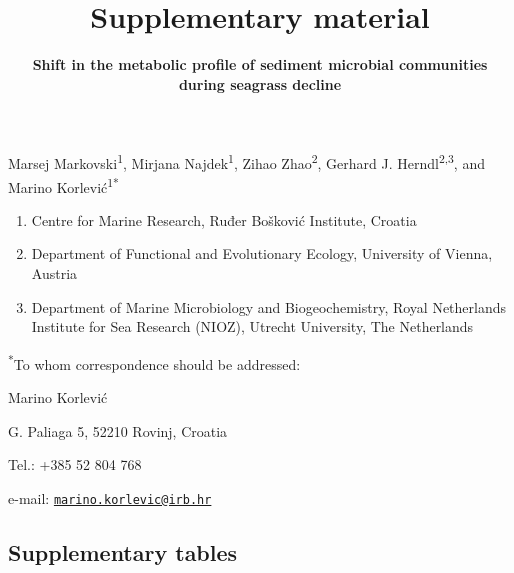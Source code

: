 \documentclass[
  12 pt,
]{article}
\title{\textbf{Supplementary material}}
\subtitle{\textbf{Shift in the metabolic profile of sediment microbial communities during seagrass decline}}
\author{}
\date{\vspace{-2.5em}}
\begin{document}
\maketitle


\renewcommand{\figurename}{Supplementary Figure}
\renewcommand{\tablename}{Supplementary Table}
\renewcommand{\thefigure}{S\arabic{figure}}
\renewcommand{\thetable}{S\arabic{table}}

\vspace{\fill}

Marsej Markovski\textsuperscript{1}, Mirjana Najdek\textsuperscript{1}, Zihao Zhao\textsuperscript{2}, Gerhard J. Herndl\textsuperscript{2,3}, and Marino Korlević\textsuperscript{1*}

\begin{enumerate}
\def\labelenumi{\arabic{enumi}.}
\item
  Centre for Marine Research, Ruđer Bošković Institute, Croatia
\item
  Department of Functional and Evolutionary Ecology, University of Vienna, Austria
\item
  Department of Marine Microbiology and Biogeochemistry, Royal Netherlands Institute for Sea Research (NIOZ), Utrecht University, The Netherlands
\end{enumerate}

\textsuperscript{*}To whom correspondence should be addressed:

Marino Korlević

G. Paliaga 5, 52210 Rovinj, Croatia

Tel.: +385 52 804 768

e-mail: \href{mailto:marino.korlevic@irb.hr}{\nolinkurl{marino.korlevic@irb.hr}}

\setlength\parindent{24pt}
\newpage

\hypertarget{supplementary-tables}{%
\subsection{Supplementary tables}\label{supplementary-tables}}
\end{document}
